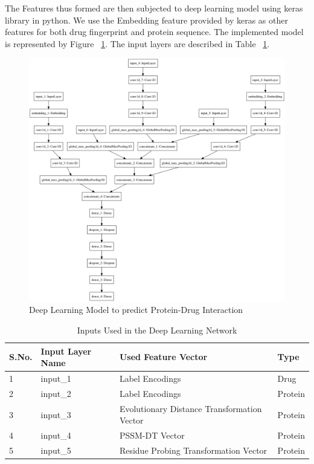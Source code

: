   The Features thus formed are then subjected to deep learning model using keras library in python. We use the Embedding feature provided by keras as other features for both drug fingerprint and protein sequence. The implemented model is represented by Figure ~\ref{fig:dlm}. The input layers are described in Table ~\ref{table:inputs}.
  
  \begin{figure}[ht]
  \centering
  \includegraphics[width=1\linewidth]{mainmatter/3-Methodology/images/build_combined_categorical_tensor_contact_new.png}
  \caption{Deep Learning Model to predict Protein-Drug Interaction}
  \label{fig:dlm}
  \end{figure}
  \begin{table}[ht]\centering
    \caption{Inputs Used in the Deep Learning Network} 
    \begin{tabular}{|l|l|l|l|}
      \hline 
      S.No. & Input Layer Name & Used Feature Vector & Type \\ \hline
      1 & input\_1 & Label Encodings & Drug \\ \hline
      2 & input\_2 & Label Encodings & Protein \\ \hline
      3 & input\_3 & Evolutionary Distance Transformation Vector& Protein \\ \hline
      4 & input\_4 & PSSM-DT Vector & Protein \\ \hline
      5 & input\_5 & Residue Probing Transformation Vector & Protein \\   \hline 
    \end{tabular} 
    \label{table:inputs}
  \end{table}
  

